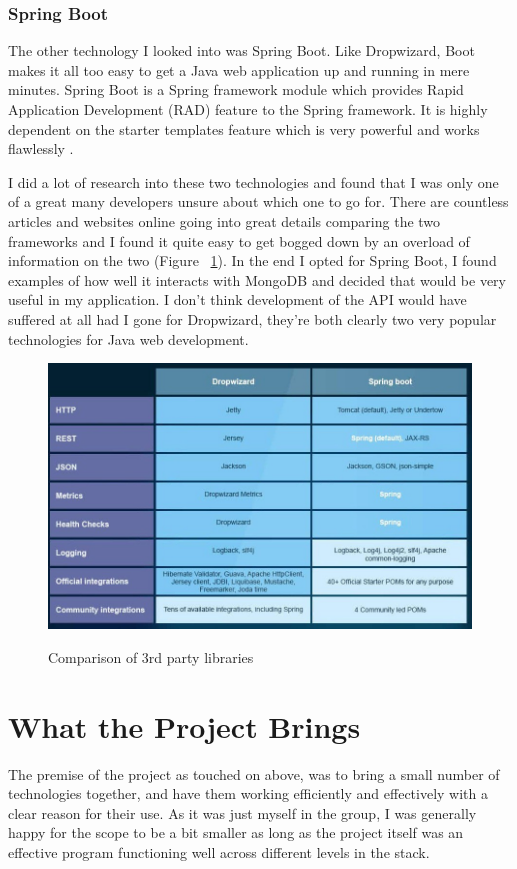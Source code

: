 \subsubsection{Spring Boot}
The other technology I looked into was Spring Boot. Like Dropwizard, Boot makes it all too easy to get a Java web application up and running in mere minutes. Spring Boot is a Spring framework module which provides Rapid Application Development (RAD) feature to the Spring framework. It is highly dependent on the starter templates feature which is very powerful and works flawlessly \cite{boot:howto}.

I did a lot of research into these two technologies and found that I was only one of a great many developers unsure about which one to go for. There are countless articles and websites online going into great details comparing the two frameworks and I found it quite easy to get bogged down by an overload of information on the two (Figure ~\ref{drop_label}). In the end I opted for Spring Boot, I found examples of how well it interacts with MongoDB and decided that would be very useful in my application. I don't think development of the API would have suffered at all had I gone for Dropwizard, they're both clearly two very popular technologies for Java web development.

\begin{figure}[h]
    \centering
    \includegraphics[scale=0.3]{Images/dropwizard.jpeg} 
    \label{drop_label}
    \caption{Comparison of 3rd party libraries}
\end{figure}

\section{What the Project Brings}
The premise of the project as touched on above, was to bring a small number of technologies together, and have them working efficiently and effectively with a clear reason for their use. As it was just myself in the group, I was generally happy for the scope to be a bit smaller as long as the project itself was an effective program functioning well across different levels in the stack.

